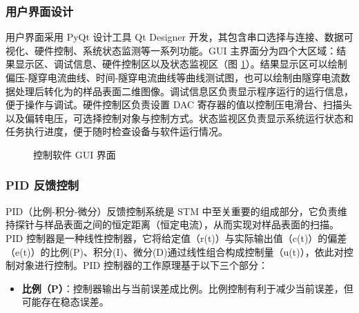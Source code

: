 \documentclass{article}
\begin{document}
\begin{spacing}{1.625}
	
	\subsubsection{用户界面设计}
	用户界面采用 PyQt 设计工具 Qt Designer 开发，其包含串口选择与连接、数据可视化、硬件控制、系统状态监测等一系列功能。GUI 主界面分为四个大区域：结果显示区、调试信息、硬件控制区以及状态监视区（图 \ref{fig19}）。结果显示区可以绘制偏压-隧穿电流曲线、时间-隧穿电流曲线等曲线测试图，也可以绘制由隧穿电流数据处理后转化为的样品表面二维图像。调试信息区负责显示程序运行的运行信息，便于操作与调试。硬件控制区负责设置 DAC 寄存器的值以控制压电滑台、扫描头以及偏转电压，可选择控制对象与控制方式。状态监视区负责显示系统运行状态和任务执行进度，便于随时检查设备与软件运行情况。
	
	\begin{figure}[!h]
		\centering
		\caption{控制软件 GUI 界面}
		\label{fig19}
	\end{figure}
	
	
	
	\subsubsection{PID 反馈控制}		
	PID（比例-积分-微分）反馈控制系统是 STM 中至关重要的组成部分，它负责维持探针与样品表面之间的恒定距离（恒定电流），从而实现对样品表面的扫描。PID 控制器是一种线性控制器，它将给定值（r(t)）与实际输出值（c(t)）的偏差（e(t)）的比例(P)、积分(I)、微分(D)通过线性组合构成控制量（u(t)），依此对控制对象进行控制\cite{ref20}。PID 控制器的工作原理基于以下三个部分：
	\begin{itemize}
		\item \textbf{比例（P）}：控制器输出与当前误差成比例。比例控制有利于减少当前误差，但可能存在稳态误差。
		

\end{itemize}
\end{spacing}
\end{document}
